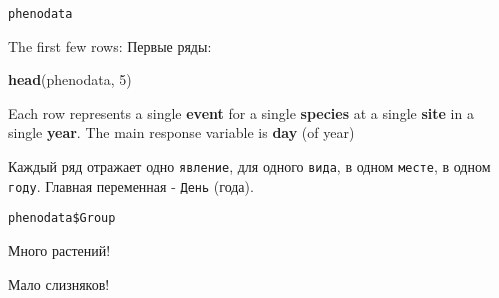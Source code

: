 \documentclass[9pt,ignorenonframetext,aspectratio=169]{beamer}
\newenvironment{Shaded}{\begin{snugshade}}{\end{snugshade}}
\newcommand{\DataTypeTok}[1]{\textcolor[rgb]{0.13,0.29,0.53}{#1}}
\newcommand{\DecValTok}[1]{\textcolor[rgb]{0.00,0.00,0.81}{#1}}
\newcommand{\KeywordTok}[1]{\textcolor[rgb]{0.13,0.29,0.53}{\textbf{#1}}}
\newcommand{\NormalTok}[1]{#1}
\newcommand{\OperatorTok}[1]{\textcolor[rgb]{0.81,0.36,0.00}{\textbf{#1}}}
\newcommand{\OtherTok}[1]{\textcolor[rgb]{0.56,0.35,0.01}{#1}}
\begin{document}
\begin{frame}[fragile]{\texttt{phenodata}}
\protect\hypertarget{phenodata}{}

\bcols{}The first few rows: Первые ряды:\ecols

\begin{Shaded}
\begin{Highlighting}[]
\KeywordTok{head}\NormalTok{(phenodata, }\DecValTok{5}\NormalTok{)}
\end{Highlighting}
\end{Shaded}

\scriptsize

\small
\bcols{}

Each row represents a single \textbf{event} for a single
\textbf{species} at a single \textbf{site} in a single \textbf{year}.
The main response variable is \textbf{day} (of year)


Каждый ряд отражает одно \texttt{явление}, для одного \texttt{вида}, в
одном \texttt{месте}, в одном \texttt{году}. Главная переменная -
\texttt{День} (года).\\
\ecols

\end{frame}

\begin{frame}[fragile]{\texttt{phenodata\$Group}}
\protect\hypertarget{phenodatagroup}{}

\footnotesize

\begin{Shaded}
\end{Shaded}

\nup

\begin{Shaded}
\end{Shaded}

\bcols{}

\normalsize

Много растений!

Мало слизняков! \ecols

\end{frame}
\end{document}
